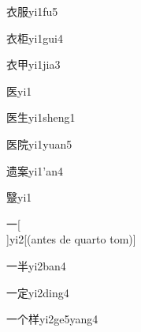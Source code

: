 \begin{verbete}[6;8]{衣服}{yi1fu5}
\end{verbete}

\begin{verbete}[6;8]{衣柜}{yi1gui4}
\end{verbete}

\begin{verbete}[6;5]{衣甲}{yi1jia3}
\end{verbete}

\begin{verbete}[7]{医}{yi1}
\end{verbete}

\begin{verbete}[7;5]{医生}{yi1sheng1}
\end{verbete}

\begin{verbete}[7;9]{医院}{yi1yuan5}
\end{verbete}

\begin{verbete}[12;10]{遗案}{yi1'an4}
\end{verbete}

\begin{verbete}[18]{毉}{yi1}
\end{verbete}

\begin{verbete}[1]{一}[\\]{yi2}[(antes de quarto tom)]
\end{verbete}

\begin{verbete}[1;5]{一半}{yi2ban4}
\end{verbete}

\begin{verbete}[1;8]{一定}{yi2ding4}
\end{verbete}

\begin{verbete}[1;2;10]{一个样}{yi2ge5yang4}
\end{verbete}

